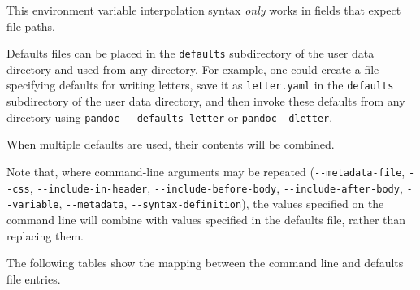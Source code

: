 \documentclass[
]{article}
\begin{document}
This environment variable interpolation syntax \emph{only} works in
fields that expect file paths.

Defaults files can be placed in the \texttt{defaults} subdirectory of
the user data directory and used from any directory. For example, one
could create a file specifying defaults for writing letters, save it as
\texttt{letter.yaml} in the \texttt{defaults} subdirectory of the user
data directory, and then invoke these defaults from any directory using
\texttt{pandoc\ -\/-defaults\ letter} or \texttt{pandoc\ -dletter}.

When multiple defaults are used, their contents will be combined.

Note that, where command-line arguments may be repeated
(\texttt{-\/-metadata-file}, \texttt{-\/-css},
\texttt{-\/-include-in-header}, \texttt{-\/-include-before-body},
\texttt{-\/-include-after-body}, \texttt{-\/-variable},
\texttt{-\/-metadata}, \texttt{-\/-syntax-definition}), the values
specified on the command line will combine with values specified in the
defaults file, rather than replacing them.

The following tables show the mapping between the command line and
defaults file entries.
\end{document}
